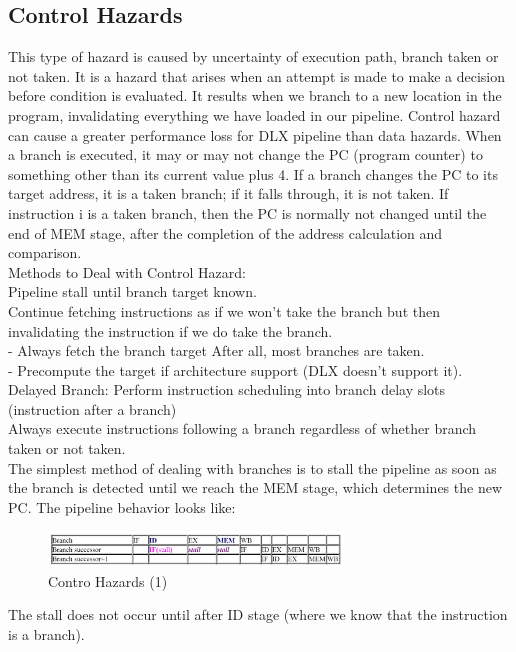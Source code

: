 \documentclass[12pt,a4paper]{report}
\begin{document}
\subsection{Control Hazards}
This type of hazard is caused by uncertainty of execution path, branch taken or not taken. It is a hazard that arises when an attempt is made to make a decision before condition is evaluated. It results when we branch to a new location in the program, invalidating everything we have loaded in our pipeline. Control hazard can cause a greater performance loss for DLX pipeline than data hazards. When a branch is executed, it may or may not change the PC (program counter) to something other than its current value plus 4. If a branch changes the PC to its target address, it is a taken branch; if it falls through, it is not taken. If instruction i is a taken branch, then the PC is normally not changed until the end of MEM stage, after the completion of the address calculation and comparison. \\
Methods to Deal with Control Hazard: \\
Pipeline stall until branch target known.  \\
Continue fetching instructions as if we won’t take the branch but then invalidating the instruction if we do take the branch. \\
- Always fetch the branch target After all, most branches are taken. \\
- Precompute the target if architecture support (DLX doesn’t support it). \\
Delayed Branch: Perform instruction scheduling into branch delay slots (instruction after a branch) \\
Always execute instructions following a branch regardless of whether branch taken or not taken. \\
The simplest method of dealing with branches is to stall the pipeline as soon as the branch is detected until we reach the MEM stage, which determines the new PC. The pipeline behavior looks like: \\
\begin{figure}[h]
  \centering
  \includegraphics[width=0.7\textwidth]{CH}
  \caption{Contro Hazards (1)}
  \label{fig:ch}
\end{figure}
The stall does not occur until after ID stage (where we know that the instruction is a branch).
\end{document}
